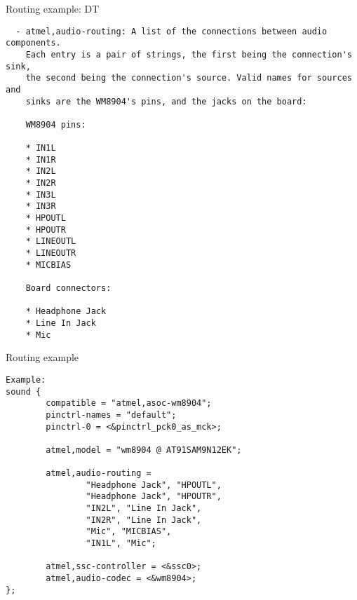 \begin{frame}[fragile]{Routing example: DT}
  \begin{block}{}
    \fontsize{8}{8}\selectfont
    \begin{verbatim}
  - atmel,audio-routing: A list of the connections between audio components.
    Each entry is a pair of strings, the first being the connection's sink,
    the second being the connection's source. Valid names for sources and
    sinks are the WM8904's pins, and the jacks on the board:

    WM8904 pins:

    * IN1L
    * IN1R
    * IN2L
    * IN2R
    * IN3L
    * IN3R
    * HPOUTL
    * HPOUTR
    * LINEOUTL
    * LINEOUTR
    * MICBIAS

    Board connectors:

    * Headphone Jack
    * Line In Jack
    * Mic
    \end{verbatim}
  \end{block}
\end{frame}

\begin{frame}[fragile]{Routing example}
  \begin{block}{}
    \fontsize{8}{8}\selectfont
    \begin{verbatim}
Example:
sound {
        compatible = "atmel,asoc-wm8904";
        pinctrl-names = "default";
        pinctrl-0 = <&pinctrl_pck0_as_mck>;

        atmel,model = "wm8904 @ AT91SAM9N12EK";

        atmel,audio-routing =
                "Headphone Jack", "HPOUTL",
                "Headphone Jack", "HPOUTR",
                "IN2L", "Line In Jack",
                "IN2R", "Line In Jack",
                "Mic", "MICBIAS",
                "IN1L", "Mic";

        atmel,ssc-controller = <&ssc0>;
        atmel,audio-codec = <&wm8904>;
};
    \end{verbatim}
  \end{block}
\end{frame}

